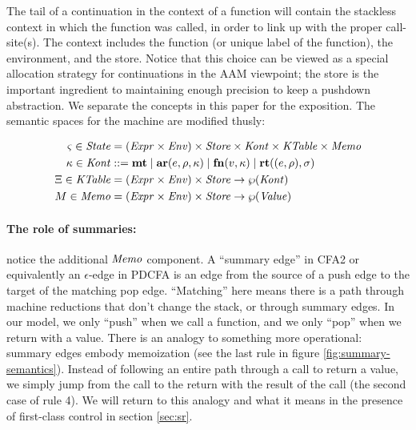 \documentclass{llncs}
\begin{document}
The tail of a continuation in the context of a function will contain
the stackless context in which the function was called, in order to
link up with the proper call-site(s). The context includes the
function (or unique label of the function), the environment, and the
store. Notice that this choice can be viewed as a special allocation
strategy for continuations in the AAM viewpoint; the store is the
important ingredient to maintaining enough precision to keep a
pushdown abstraction. We separate the concepts in this paper for the
exposition. The semantic spaces for the machine are modified thusly:

\begin{align*}
  \varsigma \in \mathit{State} &= (\mathit{Expr} \times \mathit{Env}) \times \mathit{Store} \times \mathit{Kont} \times \mathit{KTable} \times \mathit{Memo} \\
  \kappa \in \mathit{Kont} &::= \mathbf{mt}
                     \mid \mathbf{ar}{}(e,\rho,\kappa) 
                     \mid \mathbf{fn}{}(v,\kappa)
                     \mid \mathbf{rt}((e,\rho),\sigma)\\
  \Xi \in \mathit{KTable} &= (\mathit{Expr} \times \mathit{Env})\times \mathit{Store} \to \wp(\mathit{Kont}) \\
  M \in \mathit{Memo} &= (\mathit{Expr} \times \mathit{Env})\times \mathit{Store} \to \wp(\mathit{Value})
\end{align*}

\paragraph{The role of summaries:} notice the additional $\mathit{Memo}$
component. A ``summary edge'' in CFA2 or equivalently an
$\epsilon$-edge in PDCFA is an edge from the source of a push edge to
the target of the matching pop edge. ``Matching'' here means there is
a path through machine reductions that don't change the stack, or
through summary edges. In our model, we only ``push'' when we call a
function, and we only ``pop'' when we return with a value. There is an
analogy to something more operational: summary edges embody
memoization (see the last rule in figure
\ref{fig:summary-semantics}). Instead of following an entire path
through a call to return a value, we simply jump from the call to the
return with the result of the call (the second case of rule 4). We
will return to this analogy and what it means in the presence of
first-class control in section \ref{sec:sr}.
\end{document}
